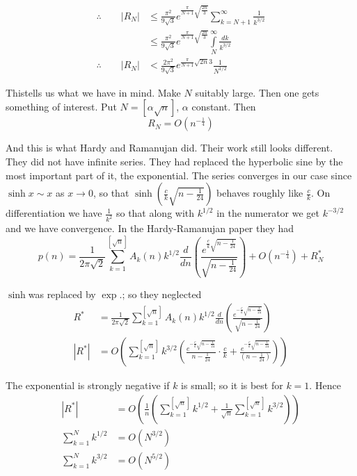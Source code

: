 \begin{align*}
  \therefore \qquad |R_N| &\leq \frac{\pi^2}{9 \sqrt{3}}
  e^{\frac{\pi}{N+1} \sqrt{\frac{2n}{3}}} \sum^\infty_{k=N+1}
  \frac{1}{k^{3/2}}\\
  & \leq \frac{\pi^2}{9 \sqrt{3}} e^{\frac{\pi}{N+1}
    \sqrt{\frac{2n}{3}}} \int\limits^{\infty}_{N} \frac{dk}{k^{3/2}}\\
  \therefore \qquad |R_N| & < \frac{2\pi^2}{9 \sqrt{3}}
  e^{\frac{\pi}{N+1}\sqrt{2n}{3}}\frac{1}{N^{1/2}} 
\end{align*}

This\pageoriginale tells us what we have in mind. Make $N$ suitably
large. Then one gets something of interest. Put $N= [\alpha
  \sqrt{n}]$, $\alpha$ constant. Then
$$
R_N = O (n^{-\frac{1}{4}})
$$

And this is what Hardy and Ramanujan did. Their work still looks
different. They did not have infinite series. They had replaced the
hyperbolic sine by the most important part of it, the exponential. The
series converges in our case since $\sinh x \sim x$ as $x \to 0$, so
that $\sinh \left( \frac{c}{k} \sqrt{n- \frac{1}{24}}\right)$ behaves
roughly like $\frac{c}{k}$. On differentiation we have $\frac{1}{k^2}$
so that along with $k^{1/2}$ in the numerator we get $k^{-3/2}$ and we
have convergence. In the Hardy-Ramanujan paper they had
$$
p(n) = \frac{1}{2 \pi \sqrt{2}} \sum^{[\sqrt{n}]}_{k=1} A_k (n)
k^{1/2} \frac{d}{dn} \left( \frac{e^{\frac{c}{k} \sqrt{n-
      \frac{1}{24}}}}{\sqrt{n- \frac{1}{24}}}\right)+ O 
(n^{-\frac{1}{4}})+ R^*_N 
$$

$\sinh$\pageoriginale was replaced by $\exp$.; so they neglected
\begin{align*}
  R^* & = \frac{1}{2 \pi \sqrt{2}} \sum^{[\sqrt{n}]}_{k=1} A_k (n)
  k^{1/2} \frac{d}{dn} \left(\frac{e^{- \frac{c}{k} \sqrt{n-
        \frac{1}{24}}}}{\sqrt{n- \frac{1}{24}}} \right)\\
  |R^*| & = O  \left(\sum^{[\sqrt{n}]}_{k=1} k^{3/2} \left(
  \frac{e^{- \frac{c}{k} \sqrt{n- \frac{1}{24}}}}{n- \frac{1}{24}}
  \cdot \frac{c}{k} + \frac{e^{-\frac{c}{k} \sqrt{n-
        \frac{1}{24}}}}{(n- \frac{1}{24})}\right) \right)
\end{align*}

The exponential is strongly negative if $k$ is small; so it is best
for $k=1$. Hence 
\begin{align*}
  |R^*| & = O  \left( \frac{1}{n} \left( \sum^{[\sqrt{n}]}_{k=1}
  k^{1/2} + \frac{1}{\sqrt{n}} \sum^{[\sqrt{n}]}_{k=1}
  k^{3/2}\right)\right)\\ 
  \sum^{N}_{k=1} k^{1/2} & = O  (N^{3/2})\\
  \sum^{N}_{k=1} k^{3/2} & = O  (N^{5/2}) 
\end{align*}

